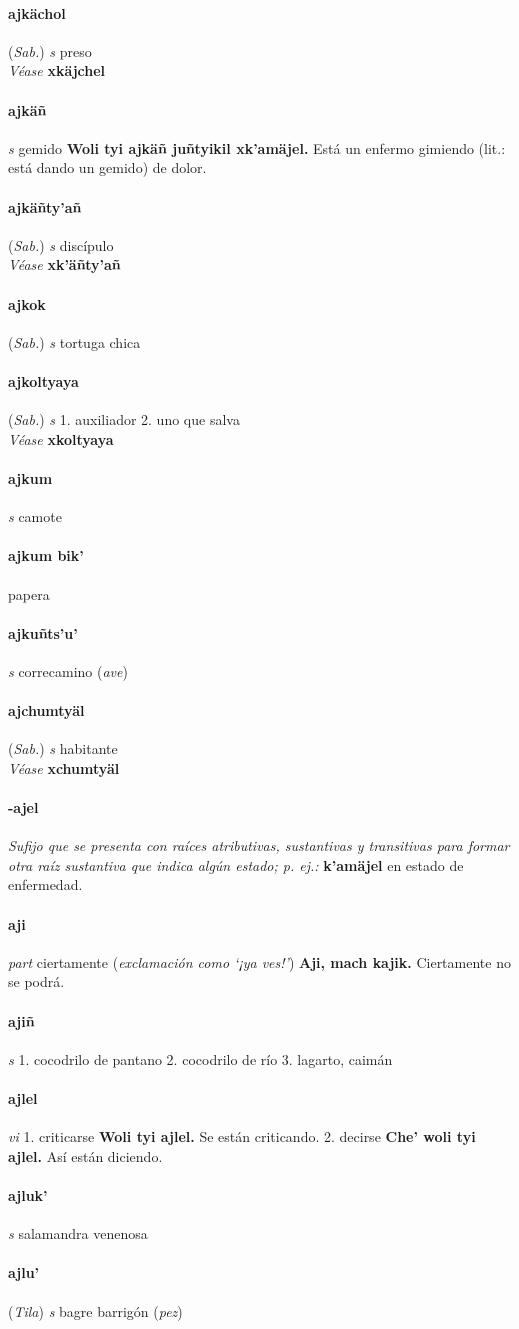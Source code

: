 \documentclass{scrbook}
\newcommand{\entry}[1]{\paragraph{#1}}
\newcommand{\onedefinition}[1]{#1.}
\newcommand{\nontranslationdef}[1]{\textit{#1}}
\newcommand{\partofspeech}[1]{\textit{#1}}
\newcommand{\spanishtranslation}[1]{#1}
\newcommand{\clarification}[1]{(\textit{#1})}
\newcommand{\cholexample}[1]{\textbf{#1}}
\newcommand{\exampletranslation}[1]{#1}
\newcommand{\alsosee}[1]{\\\textit{Véase} \textbf{#1}}
\newcommand{\relevantdialect}[1]{(\textit{#1})}
\begin{document}
\begin{multicols}{2}
\entry{ajkächol}
\relevantdialect{Sab.}
\partofspeech{s}
\spanishtranslation{preso}
\alsosee{xkäjchel}

\entry{ajkäñ}
\partofspeech{s}
\spanishtranslation{gemido}
\cholexample{Woli tyi ajkäñ juñtyikil xk'amäjel.}
\exampletranslation{Está un enfermo gimiendo (lit.: está dando un gemido) de dolor.}

\entry{ajkäñty'añ}
\relevantdialect{Sab.}
\partofspeech{s}
\spanishtranslation{discípulo}
\alsosee{xk'äñty'añ}

\entry{ajkok}
\relevantdialect{Sab.}
\partofspeech{s}
\spanishtranslation{tortuga chica}

\entry{ajkoltyaya}
\relevantdialect{Sab.}
\partofspeech{s}
\onedefinition{1}
\spanishtranslation{auxiliador}
\onedefinition{2}
\spanishtranslation{uno que salva}
\alsosee{xkoltyaya}

\entry{ajkum}
\partofspeech{s}
\spanishtranslation{camote}

\entry{ajkum bik'}
\spanishtranslation{papera}

\entry{ajkuñts'u'}
\partofspeech{s}
\spanishtranslation{correcamino}
\clarification{ave}

\entry{ajchumtyäl}
\relevantdialect{Sab.}
\partofspeech{s}
\spanishtranslation{habitante}
\alsosee{xchumtyäl}

\entry{-ajel}
\nontranslationdef{Sufijo que se presenta con raíces atributivas, sustantivas y transitivas para formar otra raíz sustantiva que indica algún estado; p. ej.:}
\cholexample{k'amäjel}
\exampletranslation{en estado de enfermedad.}

\entry{aji}
\partofspeech{part}
\spanishtranslation{ciertamente}
\clarification{exclamación como ‘¡ya ves!’}
\cholexample{Aji, mach kajik.}
\exampletranslation{Ciertamente no se podrá.}

\entry{ajiñ}
\partofspeech{s}
\onedefinition{1}
\spanishtranslation{cocodrilo de pantano}
\onedefinition{2}
\spanishtranslation{cocodrilo de río}
\onedefinition{3}
\spanishtranslation{lagarto, caimán}

\entry{ajlel}
\partofspeech{vi}
\onedefinition{1}
\spanishtranslation{criticarse}
\cholexample{Woli tyi ajlel.}
\exampletranslation{Se están criticando.}
\onedefinition{2}
\spanishtranslation{decirse}
\cholexample{Che' woli tyi ajlel.}
\exampletranslation{Así están diciendo.}

\entry{ajluk'}
\partofspeech{s}
\spanishtranslation{salamandra venenosa}

\entry{ajlu'}
\relevantdialect{Tila}
\partofspeech{s}
\spanishtranslation{bagre barrigón}
\clarification{pez}


\end{multicols}
\end{document}
